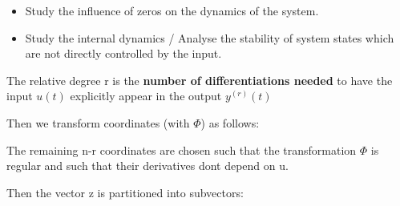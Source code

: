 \documentclass[10pt,a4paper]{scrartcl}
\begin{document}
\begin{multicols*}{3}
\begin{itemize}
\ncompaq
\item Study the influence of zeros on the dynamics of the system.
\item Study the internal dynamics / Analyse the stability of system states which are not directly controlled by the input.
\end{itemize}

The relative degree r is the \textbf{number of differentiations needed} to have the input $u(t)$ explicitly appear in the output $y^{(r)}(t)$


Then we transform coordinates (with $\Phi$) as follows:


The remaining n-r coordinates are chosen such that the transformation $\Phi$ is regular and such that their derivatives dont depend on u.


Then the vector z is partitioned into subvectors:


\end{multicols*}
\end{document}
